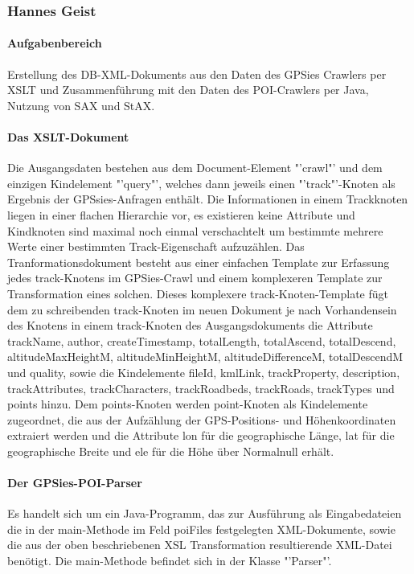 \subsubsection{Hannes Geist}
\paragraph{Aufgabenbereich}
Erstellung des DB-XML-Dokuments aus den Daten des GPSies Crawlers per XSLT und Zusammenführung mit den Daten des POI-Crawlers per Java, Nutzung von SAX und StAX.

\paragraph{Das XSLT-Dokument}
Die Ausgangsdaten bestehen aus dem Document-Element "'crawl"' und dem einzigen Kindelement "'query"', welches dann jeweils einen "'track"'-Knoten als Ergebnis der GPSsies-Anfragen enthält. Die Informationen in einem Trackknoten liegen in einer flachen Hierarchie vor, es existieren keine Attribute und Kindknoten sind maximal noch einmal verschachtelt um bestimmte mehrere Werte einer bestimmten Track-Eigenschaft aufzuzählen.
Das Tranformationsdokument besteht aus einer einfachen Template zur Erfassung jedes track-Knotens im GPSies-Crawl und einem komplexeren Template zur Transformation eines solchen. Dieses komplexere track-Knoten-Template fügt dem zu schreibenden track-Knoten im neuen Dokument je nach Vorhandensein des Knotens in einem track-Knoten des Ausgangsdokuments die Attribute trackName, author, createTimestamp, totalLength, totalAscend, totalDescend, altitudeMaxHeightM, altitudeMinHeightM, altitudeDifferenceM, totalDescendM und quality, sowie die Kindelemente fileId, kmlLink, trackProperty, description, trackAttributes, trackCharacters, trackRoadbeds, trackRoads, trackTypes und points hinzu. Dem points-Knoten werden point-Knoten als Kindelemente zugeordnet, die aus der Aufzählung der GPS-Positions- und Höhenkoordinaten extraiert werden und die Attribute lon für die geographische Länge, lat für die geographische Breite und ele für die Höhe über Normalnull erhält.

\paragraph{Der GPSies-POI-Parser}
Es handelt sich um ein Java-Programm, das zur Ausführung als Eingabedateien die in der main-Methode im Feld poiFiles festgelegten XML-Dokumente, sowie die aus der oben beschriebenen XSL Transformation resultierende XML-Datei benötigt. Die main-Methode befindet sich in der Klasse "'Parser"'.

